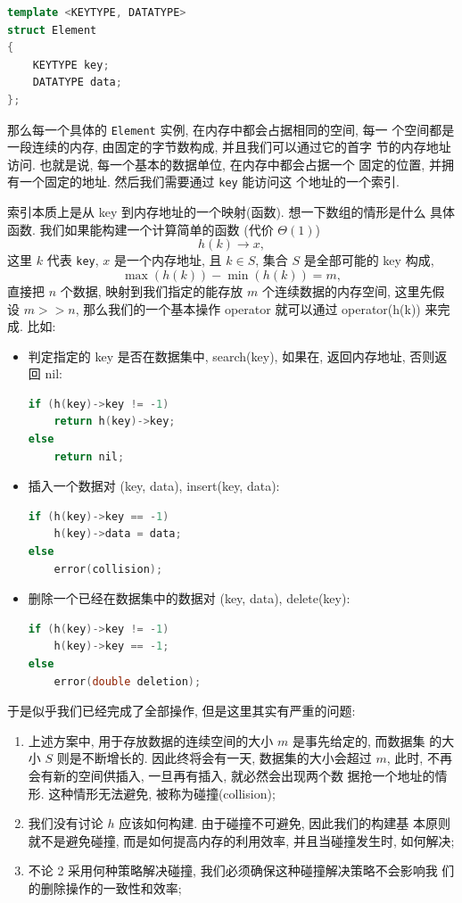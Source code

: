 \documentclass[a4paper]{ctexart}
\theoremstyle{definition}
\theoremstyle{definition}
\begin{document}
\begin{lstlisting}[language=C++]
template <KEYTYPE, DATATYPE>
struct Element
{
    KEYTYPE key;
    DATATYPE data;
};
\end{lstlisting}

那么每一个具体的 \verb|Element| 实例, 在内存中都会占据相同的空间, 每一
个空间都是一段连续的内存, 由固定的字节数构成, 并且我们可以通过它的首字
节的内存地址访问. 也就是说, 每一个基本的数据单位, 在内存中都会占据一个
固定的位置, 并拥有一个固定的地址. 然后我们需要通过 \verb|key| 能访问这
个地址的一个索引.

索引本质上是从 key 到内存地址的一个映射(函数). 想一下数组的情形是什么
具体函数. 我们如果能构建一个计算简单的函数 (代价 $\Theta(1)$)
$$
h(k) \to x,
$$
这里 $k$ 代表 \verb|key|, $x$ 是一个内存地址, 且 $k \in S$, 集合 $S$
是全部可能的 key 构成,
$$
\max(h(k)) - \min(h(k)) = m,
$$
直接把 $n$ 个数据, 映射到我们指定的能存放 $m$ 个连续数据的内存空间, 这里先假设 $m
>> n$, 那么我们的一个基本操作 operator 就可以通过 operator(h(k)) 来完
成. 比如:
\begin{itemize}

  \item 判定指定的 key 是否在数据集中, search(key), 如果在, 返回内存地址,
     否则返回 nil:

\begin{lstlisting}[language=C++]
if (h(key)->key != -1)
    return h(key)->key;
else
    return nil;
\end{lstlisting}

\item 插入一个数据对 (key, data), insert(key, data):
\begin{lstlisting}[language=C++]
if (h(key)->key == -1)
    h(key)->data = data;
else
    error(collision);
\end{lstlisting}

\item 删除一个已经在数据集中的数据对 (key, data), delete(key):
\begin{lstlisting}[language=C++]
if (h(key)->key != -1)
    h(key)->key == -1;
else
    error(double deletion);
\end{lstlisting}
\end{itemize}

于是似乎我们已经完成了全部操作, 但是这里其实有严重的问题:

\begin{enumerate}
\item 上述方案中, 用于存放数据的连续空间的大小 $m$ 是事先给定的, 而数据集
   的大小 $S$ 则是不断增长的. 因此终将会有一天, 数据集的大小会超过
   $m$, 此时, 不再会有新的空间供插入, 一旦再有插入, 就必然会出现两个数
   据抢一个地址的情形. 这种情形无法避免, 被称为碰撞(collision);
\item 我们没有讨论 $h$ 应该如何构建. 由于碰撞不可避免, 因此我们的构建基
    本原则就不是避免碰撞, 而是如何提高内存的利用效率, 并且当碰撞发生时,
    如何解决;
\item 不论 2 采用何种策略解决碰撞, 我们必须确保这种碰撞解决策略不会影响我
   们的删除操作的一致性和效率;
\end{enumerate}
\end{document}
